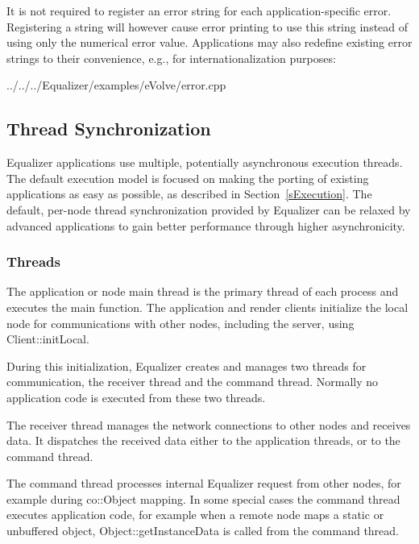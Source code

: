 \documentclass[10pt,a4]{scrartcl}
\newcommand{\sref}[1]{Section~\ref{#1}}
\begin{document}
It is not required to register an error string for each application-specific
error. Registering a string will however cause error printing to use this string
instead of using only the numerical error value. Applications may also redefine
existing error strings to their convenience, e.g., for internationalization
purposes:

{\footnotesize
  {../../../Equalizer/examples/eVolve/error.cpp}}


\subsection{\label{sThreads}Thread Synchronization}

Equalizer applications use multiple, potentially asynchronous execution
threads. The default execution model is focused on making the porting of
existing applications as easy as possible, as described in
\sref{sExecution}. The default, per-node thread synchronization provided
by Equalizer can be relaxed by advanced applications to gain better
performance through higher asynchronicity.

\subsubsection{Threads}

The application or node main thread is the primary thread of each
process and executes the \textsf{main} function. The application and
render clients initialize the local node for communications with other
nodes, including the server, using \textsf{Client::initLocal}.

During this initialization, Equalizer creates and manages two threads
for communication, the receiver thread and the command thread. Normally
no application code is executed from these two threads.

The receiver thread manages the network connections to other nodes and
receives data. It dispatches the received data either to the application
threads, or to the command thread.

The command thread processes internal Equalizer request from other
nodes, for example during \textsf{co::Object} mapping. In some
special cases the command thread executes application code, for example
when a remote node maps a static or unbuffered object,
\textsf{Object::getInstanceData} is called from the command thread.
\end{document}
